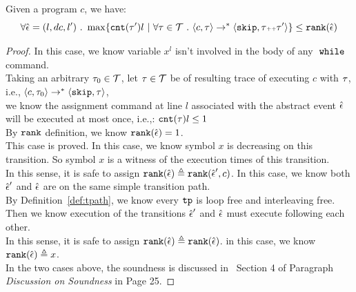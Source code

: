   \begin{lem}
    \label{lem:local_bound_sound}
  Given a program ${c}$, we have:
  \[
  \forall \absevent = (l, dc, l') \sthat 
  \max \left\{ \counter(\vtrace') l ~ \middle\vert~
  \forall \vtrace \in \mathcal{T} \sthat \config{{c}, \trace} \to^{*} \config{\eskip, \trace\tracecat\vtrace'} \right\} 
  \leq 
  \rank(\absevent)
  \]
  \end{lem}
  \begin{proof}
    In this case, we know variable $x^l$ isn't involved in the body of any $\;\mathtt{while}\;$ command. 
    \\
    Taking an arbitrary $\mathtt{\tau}_0 \in \mathcal{T}$, 
    let $\mathtt{\tau} \in \mathcal{T}$ be of resulting trace of executing $c$ with $\mathtt{\tau}$, 
    i.e., $\langle {c}, \mathtt{\tau}_0 \rangle \to^{*} \langle \mathtt{skip}, \mathtt{\tau} \rangle$,
    \\
    we know the
    assignment command at line $l$ associated with the abstract event $\hat{\mathtt{\epsilon}{}}$ will be executed at most once, i.e.,:
    $\mathtt{cnt}(\mathtt{\tau}) l \leq 1$
    \\
    By $\mathtt{rank}$ definition, we know $\mathtt{rank}(\hat{\mathtt{\epsilon}{}}) = 1$.
    \\
    This case is proved.
    In this case, we know symbol $x$ is decreasing on this transition. So symbol $x$ is a witness of the execution times of this transition.
    \\
    In this sense, it is safe to assign 
    $\mathtt{rank}(\hat{\mathtt{\epsilon}{}}) \triangleq \mathtt{rank}(\hat{\mathtt{\epsilon}{}}', c)$.
    In this case, we know both $\hat{\mathtt{\epsilon}{}}'$ and $\hat{\mathtt{\epsilon}{}}$ are on the same simple transition path.
    \\
    By Definition~\ref{def:tpath}, we know every $\mathtt{tp}$ is loop free and interleaving free. Then we know execution of the transitions $\hat{\mathtt{\epsilon}{}}'$ and $\hat{\mathtt{\epsilon}{}}$ must execute following each other.
    \\
    In this sense, it is safe to assign 
    $\mathtt{rank}(\hat{\mathtt{\epsilon}{}}) \triangleq \mathtt{rank}(\hat{\mathtt{\epsilon}{}})$.
      in this case, we know $\mathtt{rank}(\hat{\mathtt{\epsilon}{}}) \triangleq x$.
    \\
    In the two cases above, the soundness is discussed in~\cite{SinnZV17} Section 4 of Paragraph \emph{Discussion on Soundness} in Page 25.
  \end{proof}
